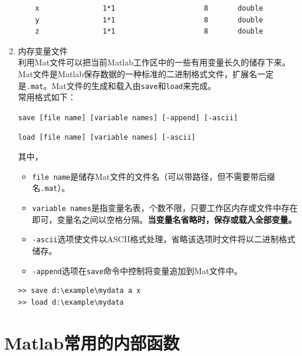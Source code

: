 \begin{enumerate}
\begin{lstlisting}
	x				1*1						8		double
	y				1*1						8		double
	z				1*1						8		double
\end{lstlisting}
\item 内存变量文件\\
利用Mat文件可以把当前Matlab工作区中的一些有用变量长久的储存下来。Mat文件是Matlab保存数据的一种标准的二进制格式文件，扩展名一定是\lstinline|.mat|。Mat文件的生成和载入由\lstinline|save|和\lstinline|load|来完成。\\
常用格式如下：
\par \quad \quad  \lstinline|save [file name] [variable names] [-append] [-ascii]|
\par \quad \quad \lstinline|load [file name] [variable names] [-ascii]|
\par 其中，
\begin{itemize}
	\item \lstinline|file name|是储存Mat文件的文件名（可以带路径，但不需要带后缀名\lstinline|.mat|）。
	\item \lstinline|variable names|是指变量名表，个数不限，只要工作区内存或文件中存在即可，变量名之间以空格分隔。\textbf{当变量名省略时，保存或载入全部变量。}
	\item \lstinline|-ascii|选项使文件以ASCII格式处理，省略该选项时文件将以二进制格式储存。
	\item \lstinline|-append|选项在\lstinline|save|命令中控制将变量追加到Mat文件中。
\end{itemize}
\begin{lstlisting}
>> save d:\example\mydata a x
>> load d:\example\mydata
\end{lstlisting}
\end{enumerate}

\section{Matlab常用的内部函数}
